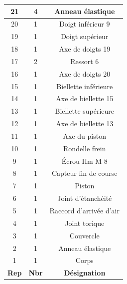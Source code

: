 \documentclass[10pt,fleqn]{article} %
\begin{document}
\begin{multicols}{2}
\begin{center}
\begin{tabular}{|c|c||c}
\hline
21	&4&	Anneau élastique	 \\ \hline
20	&1&	Doigt inférieur	9	 \\ \hline
19	&1&	Doigt supérieur	 \\ \hline
18	&1&	Axe de doigts 19	 \\ \hline
17	&2&	Ressort	6 \\ \hline
16	&1&	Axe de doigts 20 \\ \hline
15	&1&	Biellette inférieure	 \\ \hline
14	&1&	Axe de biellette 15	 \\ \hline
13	&1&	Biellette supérieure	 \\ \hline
12	&1&	Axe de biellette 13	 \\ \hline
11	&1&	Axe du piston \\ \hline
10	&1&	Rondelle frein \\ \hline
9	&1&	Écrou Hm M 8 \\ \hline
8	&1&	Capteur fin de course \\ \hline
7	&1&	Piston \\ \hline
6	&1&	Joint d’étanchéité \\ \hline
5	&1&	Raccord d’arrivée d’air \\ \hline
4	&1&	Joint torique \\ \hline
3	&1&	Couvercle \\ \hline
2	&1&	Anneau élastique \\ \hline
1	&1&	Corps \\ \hline
\hline
\textbf{Rep} & \textbf{Nbr} & \textbf{Désignation} \\ \hline
\end{tabular}
\end{center}


\end{multicols}
\end{document}
